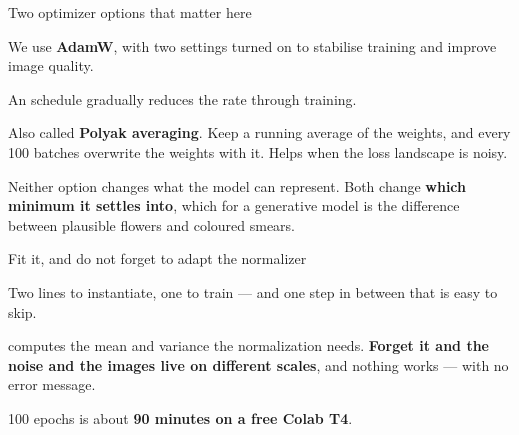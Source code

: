 \documentclass[aspectratio=169,11pt,t]{beamer}
\begin{document}
\begin{frame}[shrink=25]{Two optimizer options that matter here}
{\fontsize{9.4}{12.6}\selectfont\color{fg2}We use \textbf{AdamW}, with two settings turned on to stabilise training and improve image quality.\par}\vskip 4pt
\begin{minipage}[t]{0.494\textwidth}
\begin{icardaccent}
An  schedule gradually reduces the rate through training.
\end{icardaccent}
\end{minipage}%
\hfill
\begin{minipage}[t]{0.494\textwidth}
\begin{icardaccent}
Also called \textbf{Polyak averaging}. Keep a running average of the weights, and every 100 batches overwrite the weights with it. Helps when the loss landscape is noisy.
\end{icardaccent}
\end{minipage}%
{\fontsize{9.4}{12.6}\selectfont\color{fg2}Neither option changes what the model can represent. Both change \textbf{which minimum it settles into}, which for a generative model is the difference between plausible flowers and coloured smears.\par}\vskip 4pt
\end{frame}

\begin{frame}[shrink=25]{Fit it, and do not forget to adapt the normalizer}
{\fontsize{9.4}{12.6}\selectfont\color{fg2}Two lines to instantiate, one to train --- and one step in between that is easy to skip.\par}\vskip 4pt
\begin{iband}[rose]
 computes the mean and variance the normalization needs. \textbf{Forget it and the noise and the images live on different scales}, and nothing works --- with no error message.
\end{iband}
{\fontsize{9.4}{12.6}\selectfont\color{fg2}100 epochs is about \textbf{90 minutes on a free Colab T4}.\par}\vskip 4pt
\end{frame}
\end{document}
